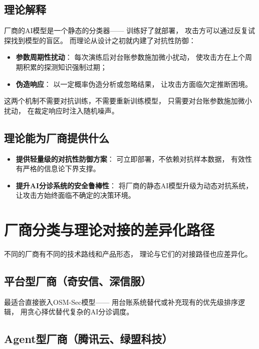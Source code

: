 \documentclass[11pt,a4paper]{article}
\begin{document}
\subsection{理论解释}

厂商的AI模型是一个静态的分类器——
训练好了就部署，
攻击方可以通过反复试探找到模型的盲区。
而理论从设计之初就内建了对抗性防御：

\begin{itemize}
    \item \textbf{参数周期性扰动}：
          每次演练后对台账参数施加微小扰动，
          使攻击方在上个周期积累的探测知识强制过期；
    \item \textbf{伪造响应}：
          以一定概率伪造分析或忽略结果，
          让攻击方面临欠定推断困境。
\end{itemize}

这两个机制不需要对抗训练，不需要重新训练模型，
只需要对台账参数施加微小扰动，
在裁定响应时注入随机噪声。

\subsection{理论能为厂商提供什么}

\begin{itemize}
    \item \textbf{提供轻量级的对抗性防御方案}：
          可立即部署，不依赖对抗样本数据，
          有效性有严格的信息论下界支撑。
    \item \textbf{提升AI分诊系统的安全鲁棒性}：
          将厂商的静态AI模型升级为动态对抗系统，
          让攻击方始终面临不确定的决策环境。
\end{itemize}

\section{厂商分类与理论对接的差异化路径}

不同的厂商有不同的技术路线和产品形态，
理论与它们的对接路径也应差异化。

\subsection{平台型厂商（奇安信、深信服）}

最适合直接嵌入OSM-Sec模型——
用台账系统替代或补充现有的优先级排序逻辑，
用贪心择优替代复杂的AI分诊调度。

\subsection{Agent型厂商（腾讯云、绿盟科技）}
\end{document}
